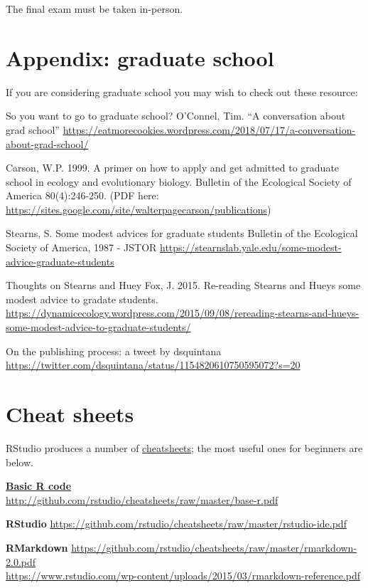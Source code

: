 \documentclass[
]{book}
\begin{document}
The final exam must be taken in-person.

\hypertarget{appendix-graduate-school}{%
\chapter{Appendix: graduate school}\label{appendix-graduate-school}}

If you are considering graduate school you may wish to check out these resource:

So you want to go to graduate school?
O'Connel, Tim. ``A conversation about grad school'' \url{https://eatmorecookies.wordpress.com/2018/07/17/a-conversation-about-grad-school/}

Carson, W.P. 1999. A primer on how to apply and get admitted to graduate school in ecology and evolutionary biology. Bulletin of the Ecological Society of America 80(4):246-250. (PDF here: \url{https://sites.google.com/site/walterpagecarson/publications})

Stearns, S. Some modest advices for graduate students
Bulletin of the Ecological Society of America, 1987 - JSTOR
\url{https://stearnslab.yale.edu/some-modest-advice-graduate-students}

Thoughts on Stearns and Huey
Fox, J. 2015. Re-reading Stearns and Hueys some modest advice to gradate students.
\url{https://dynamicecology.wordpress.com/2015/09/08/rereading-stearns-and-hueys-some-modest-advice-to-graduate-students/}

On the publishing process: a tweet by dsquintana
\url{https://twitter.com/dsquintana/status/1154820610750595072?s=20}

\hypertarget{cheat-sheets}{%
\chapter{Cheat sheets}\label{cheat-sheets}}

RStudio produces a number of \href{https://www.rstudio.com/resources/cheatsheets/\#ide}{cheatsheets}; the most useful ones for beginners are below.

\href{http://github.com/rstudio/cheatsheets/raw/master/base-r.pdf}{\textbf{Basic R code}}\\
\url{http://github.com/rstudio/cheatsheets/raw/master/base-r.pdf}

\textbf{RStudio}
\url{https://github.com/rstudio/cheatsheets/raw/master/rstudio-ide.pdf}

\textbf{RMarkdown}
\url{https://github.com/rstudio/cheatsheets/raw/master/rmarkdown-2.0.pdf}\\
\url{https://www.rstudio.com/wp-content/uploads/2015/03/rmarkdown-reference.pdf}
\end{document}
